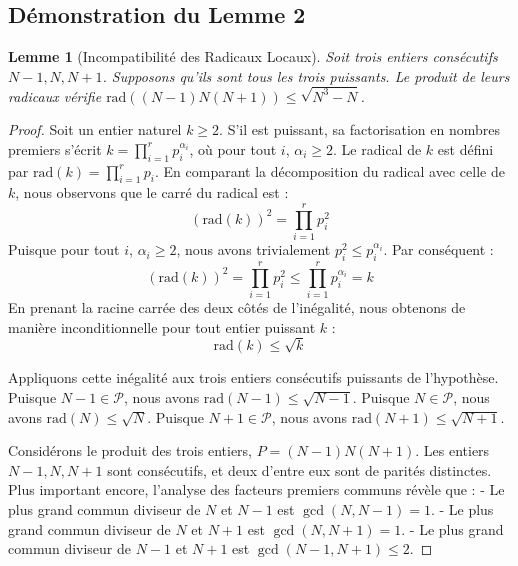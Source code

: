\documentclass[11pt,a4paper]{article}
\newtheorem{lemma}[theorem]{Lemme}
\begin{document}
\newpage
\subsection{Démonstration du Lemme 2}

\begin{lemma}[Incompatibilité des Radicaux Locaux]
Soit trois entiers consécutifs $N-1, N, N+1$. Supposons qu'ils sont tous les trois puissants. Le produit de leurs radicaux vérifie $\text{rad}((N-1)N(N+1)) \le \sqrt{N^3 - N}$.
\end{lemma}

\begin{proof}
Soit un entier naturel $k \ge 2$. S'il est puissant, sa factorisation en nombres premiers s'écrit $k = \prod_{i=1}^r p_i^{\alpha_i}$, où pour tout $i$, $\alpha_i \ge 2$.
Le radical de $k$ est défini par $\text{rad}(k) = \prod_{i=1}^r p_i$.
En comparant la décomposition du radical avec celle de $k$, nous observons que le carré du radical est :
\begin{equation}
(\text{rad}(k))^2 = \prod_{i=1}^r p_i^2
\end{equation}
Puisque pour tout $i$, $\alpha_i \ge 2$, nous avons trivialement $p_i^2 \le p_i^{\alpha_i}$.
Par conséquent :
\begin{equation}
(\text{rad}(k))^2 = \prod_{i=1}^r p_i^2 \le \prod_{i=1}^r p_i^{\alpha_i} = k
\end{equation}
En prenant la racine carrée des deux côtés de l'inégalité, nous obtenons de manière inconditionnelle pour tout entier puissant $k$ :
\begin{equation}
\text{rad}(k) \le \sqrt{k}
\end{equation}

Appliquons cette inégalité aux trois entiers consécutifs puissants de l'hypothèse.
Puisque $N-1 \in \mathcal{P}$, nous avons $\text{rad}(N-1) \le \sqrt{N-1}$.
Puisque $N \in \mathcal{P}$, nous avons $\text{rad}(N) \le \sqrt{N}$.
Puisque $N+1 \in \mathcal{P}$, nous avons $\text{rad}(N+1) \le \sqrt{N+1}$.

Considérons le produit des trois entiers, $P = (N-1)N(N+1)$. Les entiers $N-1, N, N+1$ sont consécutifs, et deux d'entre eux sont de parités distinctes. Plus important encore, l'analyse des facteurs premiers communs révèle que :
- Le plus grand commun diviseur de $N$ et $N-1$ est $\gcd(N, N-1) = 1$.
- Le plus grand commun diviseur de $N$ et $N+1$ est $\gcd(N, N+1) = 1$.
- Le plus grand commun diviseur de $N-1$ et $N+1$ est $\gcd(N-1, N+1) \le 2$.


\end{proof}
\end{document}
